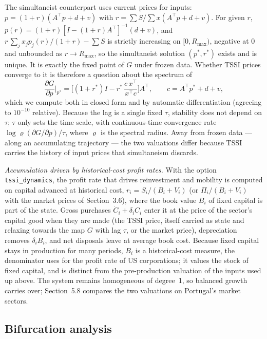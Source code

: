 \documentclass[11pt]{article}
\begin{document}
The simultaneist counterpart uses current prices for inputs: $p=(1+r)(A^{\top}p+d+v)$
with $r=\sum S/\sum x(A^{\top}p+d+v)$. For given $r$, $p(r)=(1+r)[I-(1+r)A^{\top}]^{-1}(d+v)$,
and $r\,\sum_jx_jp_j(r)/(1+r)-\sum S$ is strictly increasing on
$[0,R_{\max})$, negative at $0$ and unbounded as $r\to R_{\max}$, so the
simultaneist solution $(p^*,r^*)$ exists and is unique. It is exactly
the fixed point of $G$ under frozen data. Whether TSSI prices converge
to it is therefore a question about the spectrum of
\begin{equation}
  \frac{\partial G}{\partial p}\Big|_{p^*}
  = \Big[(1+r^*)I - r^*\,\frac{c\,x^{\top}}{x^{\top}c}\Big]A^{\top},
  \qquad c=A^{\top}p^*+d+v,
  \label{eq:tssi-jacobian}
\end{equation}
which we compute both in closed form and by automatic differentiation
(agreeing to $10^{-10}$ relative). Because the lag is a single fixed
$\tau$, stability does not depend on $\tau$; $\tau$ only sets the time
scale, with continuous-time convergence rate
$\log\varrho(\partial G/\partial p)/\tau$, where $\varrho$ is the
spectral radius. Away from frozen data --- along an accumulating
trajectory --- the two valuations differ because TSSI carries the
history of input prices that simultaneism discards.

\emph{Accumulation driven by historical-cost profit rates.} With the
option \texttt{tssi\_dynamics}, the profit rate that drives reinvestment
and mobility is computed on capital advanced at historical cost,
$r_i=S_i/(B_i+V_i)$ (or $\Pi_i/(B_i+V_i)$ with the market prices of
Section~3.6), where the book value $B_i$ of fixed capital is part of the
state. Gross purchases $\dot C_i+\delta_iC_i$ enter it at the price of
the sector's capital good when they are made (the TSSI price, itself
carried as state and relaxing towards the map $G$ with lag $\tau$, or
the market price), depreciation removes $\delta_iB_i$, and net disposals
leave at average book cost. Because fixed capital stays in production
for many periods, $B_i$ is a historical-cost measure, the denominator
\citet[chs.~5--6]{kliman2011failure} uses for the profit rate of US
corporations; it values the stock of fixed capital, and is distinct
from the pre-production valuation of the inputs used up above. The
system remains homogeneous of degree~1,
so balanced growth carries over; Section~5.8 compares the two valuations
on Portugal's market sectors.

\subsection{Bifurcation analysis}
\end{document}
